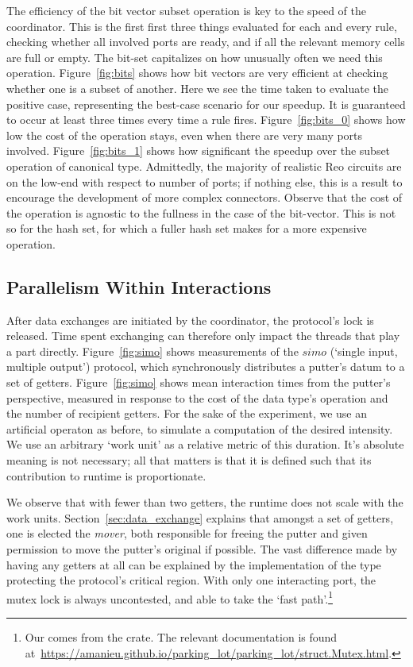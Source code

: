 The efficiency of the bit vector subset operation is key to the speed of the coordinator. This is the first first three things evaluated for each and every rule, checking whether all involved ports are ready, and if all the relevant memory cells are full or empty. The bit-set capitalizes on how unusually often we need this operation. Figure~\ref{fig:bits} shows how bit vectors are very efficient at checking whether one is a subset of another. Here we see the time taken to evaluate the positive case, representing the best-case scenario for our speedup. It is guaranteed to occur at least three times every time a rule fires. Figure~\ref{fig:bits_0} shows how low the cost of the operation stays, even when there are very many ports involved. Figure~\ref{fig:bits_1} shows how significant the speedup over the subset operation of canonical  type. Admittedly, the majority of realistic Reo circuits are on the low-end with respect to number of ports; if nothing else, this is a result to encourage the development of more complex connectors. Observe that the cost of the operation is agnostic to the fullness in the case of the bit-vector. This is not so for the hash set, for which a fuller hash set makes for a more expensive operation. 



\subsection{Parallelism Within Interactions}
After data exchanges are initiated by the coordinator, the protocol's lock is released. Time spent exchanging can therefore only impact the threads that play a part directly. Figure~\ref{fig:simo} shows measurements of the $simo$ (`single input, multiple output') protocol, which synchronously distributes a putter's datum to a set of getters. Figure~\ref{fig:simo} shows mean interaction times from the putter's perspective, measured in response to the cost of the data type's  operation and the number of recipient getters. For the sake of the experiment, we use an artificial  operaton as before, to simulate a computation of the desired intensity. We use an arbitrary `work unit' as a relative metric of this duration. It's absolute meaning is not necessary; all that matters is that it is defined such that its contribution to runtime is proportionate.

We observe that with fewer than two getters, the runtime does not scale with the work units. Section~\ref{sec:data_exchange} explains that amongst a set of getters, one is elected the \textit{mover}, both responsible for freeing the putter and given permission to move the putter's original if possible. The vast difference made by having any getters at all can be explained by the implementation of the  type protecting the protocol's critical region. With only one interacting port, the mutex lock is always uncontested, and able to take the `fast path'.\footnote{Our  comes from the  crate. The relevant documentation is found at~\url{https://amanieu.github.io/parking_lot/parking_lot/struct.Mutex.html}.}

